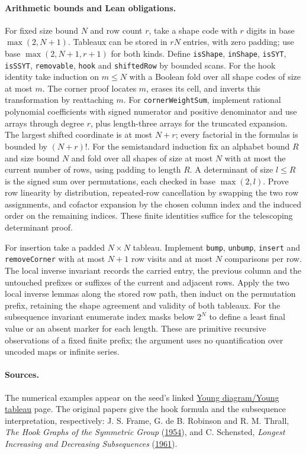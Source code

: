 \paragraph{Arithmetic bounds and Lean obligations.}
For fixed size bound \(N\) and row count \(r\), take a shape code with
\(r\) digits in base \(\max(2,N+1)\). Tableaux can be stored in
\(rN\) entries, with zero padding; use base \(\max(2,N+1,r+1)\) for
both kinds. Define \texttt{isShape}, \texttt{inShape}, \texttt{isSYT},
\texttt{isSSYT}, \texttt{removable}, \texttt{hook} and
\texttt{shiftedRow} by bounded scans. For the hook identity take
induction on \(m\le N\) with a Boolean fold over all shape codes of
size at most \(m\). The corner proof locates \(m\), erases its cell,
and inverts this transformation by reattaching \(m\).
For \texttt{cornerWeightSum}, implement rational polynomial coefficients
with signed numerator and positive denominator and use arrays through
degree \(r\), plus length-three arrays for the truncated expansion.
The largest shifted coordinate is at most \(N+r\); every factorial in
the formulas is bounded by \((N+r)!\). For the semistandard induction
fix an alphabet bound \(R\) and size bound \(N\) and fold over all shapes
of size at most \(N\) with at most the current number of rows, using
padding to length \(R\). A determinant of size \(l\le R\) is the signed
sum over permutations, each checked in base \(\max(2,l)\). Prove row
linearity by distribution, repeated-row cancellation by swapping the two
row assignments, and cofactor expansion by the chosen column index and
the induced order on the remaining indices. These finite identities
suffice for the telescoping determinant proof.

For insertion take a padded \(N\times N\) tableau. Implement
\texttt{bump}, \texttt{unbump}, \texttt{insert} and \texttt{removeCorner}
with at most \(N+1\) row visits and at most \(N\) comparisons per row.
The local inverse invariant records the carried entry, the previous
column and the untouched prefixes or suffixes of the current and
adjacent rows. Apply the two local inverse lemmas along the stored
row path, then induct on the permutation prefix, retaining the shape
agreement and validity of both tableaux. For the subsequence invariant
enumerate index masks below \(2^N\) to define a least final value or an
absent marker for each length. These are primitive recursive observations
of a fixed finite prefix; the argument uses no quantification over
uncoded maps or infinite series.

\paragraph{Sources.}
The numerical examples appear on the seed's linked
\href{https://en.wikipedia.org/wiki/Young_diagram}{Young diagram/Young tableau}
page. The original papers give the hook formula and the subsequence
interpretation, respectively: J. S. Frame, G. de B. Robinson and R. M.
Thrall, \emph{The Hook Graphs of the Symmetric Group}
(\href{https://doi.org/10.4153/CJM-1954-030-1}{1954}), and
C. Schensted, \emph{Longest Increasing and Decreasing Subsequences}
(\href{https://doi.org/10.4153/CJM-1961-015-3}{1961}).
